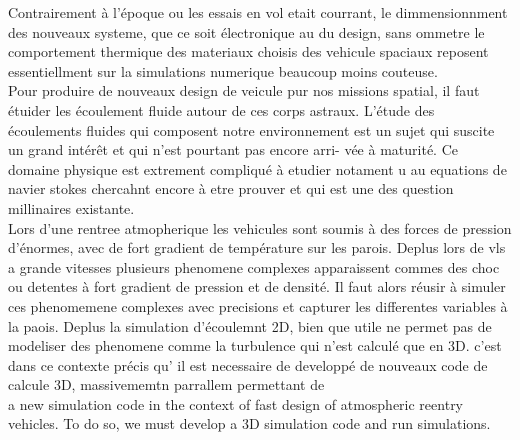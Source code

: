 Contrairement à l'époque ou les essais en vol etait courrant, le dimmensionnment des nouveaux systeme, que ce soit électronique au du design, sans ommetre le comportement thermique des materiaux choisis des vehicule spaciaux reposent essentiellment sur la simulations numerique beaucoup moins couteuse.\\
Pour produire de nouveaux design de veicule pur nos missions spatial, il faut étuider les écoulement fluide autour de ces corps astraux.
L’étude des écoulements fluides qui composent notre environnement est
un sujet qui suscite un grand intérêt et qui n’est pourtant pas encore arri-
vée à maturité. Ce domaine physique est extrement compliqué à etudier notament u au equations de navier stokes chercahnt encore à etre prouver et qui est une des question millinaires existante.\\
Lors d'une rentree atmopherique les vehicules sont soumis à des forces de pression d'énormes, avec de fort gradient de température sur les parois. Deplus
lors de vls a grande vitesses plusieurs phenomene complexes apparaissent commes des choc ou detentes à fort gradient de pression et de densité. Il faut alors réusir à simuler ces phenomemene complexes avec precisions et capturer les differentes variables  à la paois. Deplus la simulation d'écoulemnt 2D, bien que utile ne permet pas de modeliser des phenomene comme la turbulence qui n'est calculé que en 3D. c'est dans ce contexte précis qu' il est necessaire de developpé de nouveaux code de calcule 3D, massivememtn parrallem permettant de\\
a new simulation code in the context of fast design of atmospheric reentry vehicles. To do so, we must develop a 3D simulation code and run simulations.




